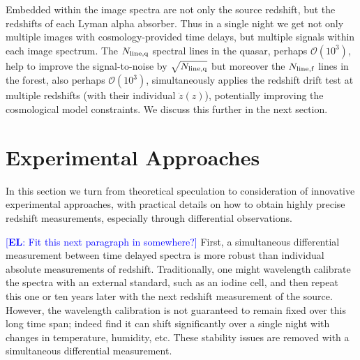 \documentclass[preprint]{aastex}
\newcommand{\eric}[1]{\textcolor{blue}{[{\bf EL}: #1]}}
\begin{document}
Embedded within the image spectra are not only the source redshift, but 
the redshifts of each Lyman alpha absorber.  Thus in a single night we get 
not only multiple images with cosmology-provided time delays, but multiple 
signals within each image spectrum.  The $N_{\rm line,q}$ spectral lines 
in the quasar, perhaps ${\mathcal O}(10^3)$, help to improve the 
signal-to-noise by $\sqrt{N_{\rm line,q}}$ but moreover the 
$N_{\rm line,f}$ lines in the forest, also perhaps ${\mathcal O}(10^3)$, 
simultaneously applies the redshift drift test at multiple redshifts 
(with their individual $\dot z(z)$), potentially improving the cosmological 
model constraints.  We discuss this further in the next section. 


\section{Experimental Approaches} \label{sec:tech} 

In this section we turn from theoretical speculation to consideration of 
innovative experimental approaches, with practical details on how to 
obtain highly precise redshift measurements, especially through differential 
observations. 

\eric{Fit this next paragraph in somewhere?} 
First, a simultaneous differential measurement between time delayed spectra 
is more robust than individual absolute measurements of redshift.  
Traditionally, one might wavelength calibrate the spectra with an external 
standard, such as an iodine cell, and then repeat this one or ten years 
later with the next redshift measurement of the source.  However, the 
wavelength calibration is not guaranteed to remain fixed over this long time 
span; indeed \cite{griest} find it can shift significantly over a single 
night with changes in temperature, humidity, etc.  These stability issues 
are removed with a simultaneous differential measurement. 

\end{document}

